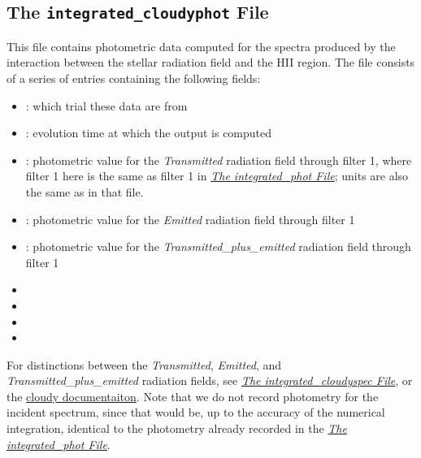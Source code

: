 \documentclass[letterpaper,10pt,english]{sphinxmanual}
\begin{document}
\subsection{The \texttt{integrated\_cloudyphot} File}
\label{cloudy:the-integrated-cloudyphot-file}
This file contains photometric data computed for the spectra produced
by the interaction between the stellar radiation field and the HII
region. The file consists of a series of entries containing the
following fields:
\begin{itemize}
\item {} 
: which trial these data are from

\item {} 
: evolution time at which the output is computed

\item {} 
: photometric value for the \emph{Transmitted}
radiation field through filter 1, where filter 1 here is the same as
filter 1 in {\hyperref[output:ssec\string-int\string-phot\string-file]{\emph{The integrated\_phot File}}}; units are also the same as
in that file.

\item {} 
: photometric value for the \emph{Emitted}
radiation field through filter 1

\item {} 
: photometric value for the
\emph{Transmitted\_plus\_emitted} radiation field through filter 1

\item {} 

\item {} 

\item {} 

\item {} 

\end{itemize}

For distinctions between the \emph{Transmitted}, \emph{Emitted}, and
\emph{Transmitted\_plus\_emitted} radiation fields, see
{\hyperref[cloudy:sssec\string-int\string-cloudyspec\string-file]{\emph{The integrated\_cloudyspec File}}}, or the \href{http://nublado.org}{cloudy documentaiton}. Note that we do not record photometry for the
incident spectrum, since that would be, up to the accuracy of the
numerical integration, identical to the photometry already recorded in
the {\hyperref[output:ssec\string-int\string-phot\string-file]{\emph{The integrated\_phot File}}}.
\end{document}
